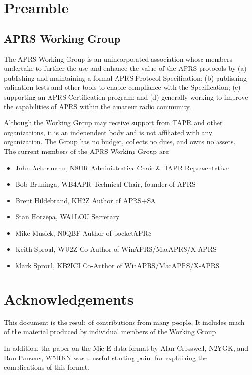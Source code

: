 \section*{Preamble}

\subsection*{APRS Working Group}

The APRS Working Group is an unincorporated association whose members
undertake to further the use and enhance the value of the APRS protocols by
(a) publishing and maintaining a formal APRS Protocol Specification; (b)
publishing validation tests and other tools to enable compliance with the
Specification; (c) supporting an APRS Certification program; and (d) generally
working to improve the capabilities of APRS within the amateur radio
community.

Although the Working Group may receive support from TAPR and other
organizations, it is an independent body and is not affiliated with any
organization. The Group has no budget, collects no dues, and owns no assets.
The current members of the APRS Working Group are:

\begin{itemize}
\item John Ackermann, N8UR Administrative Chair \& TAPR Representative
\item Bob Bruninga, WB4APR Technical Chair, founder of APRS
\item Brent Hildebrand, KH2Z Author of APRS+SA
\item Stan Horzepa, WA1LOU Secretary
\item Mike Musick, N0QBF Author of pocketAPRS
\item Keith Sproul, WU2Z Co-Author of WinAPRS/MacAPRS/X-APRS
\item Mark Sproul, KB2ICI Co-Author of WinAPRS/MacAPRS/X-APRS
\end{itemize}

\section*{Acknowledgements}
This document is the result of contributions from many people. It includes
much of the material produced by individual members of the Working
Group.

In addition, the paper on the Mic-E data format by Alan Crosswell, N2YGK,
and Ron Parsons, W5RKN was a useful starting point for explaining the
complications of this format.

